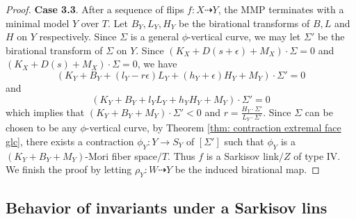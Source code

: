 \documentclass[11pt]{amsart}
\numberwithin{equation}{section}
\theoremstyle{definition}
\theoremstyle{definition}
\theoremstyle{definition}
\begin{document}
\begin{proof}
\noindent\textbf{Case 3.3}. After a sequence of flips $f: X\dashrightarrow Y$, the MMP terminates with a minimal model $Y$ over $T$. Let $B_Y,L_Y,H_Y$ be the birational transforms of $B,L$ and $H$ on $Y$ respectively. Since $\Sigma$ is a general $\phi$-vertical curve, we may let $\Sigma'$ be the birational transform of $\Sigma$ on $Y$. Since $(K_{X}+D(s+\epsilon)+M_X)\cdot\Sigma=0$ and $(K_{X}+D(s)+M_X)\cdot\Sigma=0$, we have
$$(K_Y+B_Y+(l_Y-r\epsilon)L_Y+(h_Y+\epsilon)H_Y+M_Y)\cdot\Sigma'=0$$
and
$$(K_Y+B_Y+l_YL_Y+h_YH_Y+M_Y)\cdot\Sigma'=0$$
which implies that $(K_Y+B_Y+M_Y)\cdot\Sigma'<0$ and $r=\frac{H_Y\cdot\Sigma'}{L_Y\cdot\Sigma'}$. Since $\Sigma$ can be chosen to be any $\phi$-vertical curve, by Theorem \ref{thm: contraction extremal face glc}, there exists a contraction $\phi_Y:Y\rightarrow S_Y$ of $[\Sigma']$ such that $\phi_Y$ is a $(K_Y+B_Y+M_Y)$-Mori fiber space$/T$. Thus $f$ is a Sarkisov link$/Z$ of type IV.  We finish the proof by letting $\rho_Y: W\dashrightarrow Y$ be the induced birational map.
\end{proof}

\subsection{Behavior of invariants under a Sarkisov lins}
\end{document}

